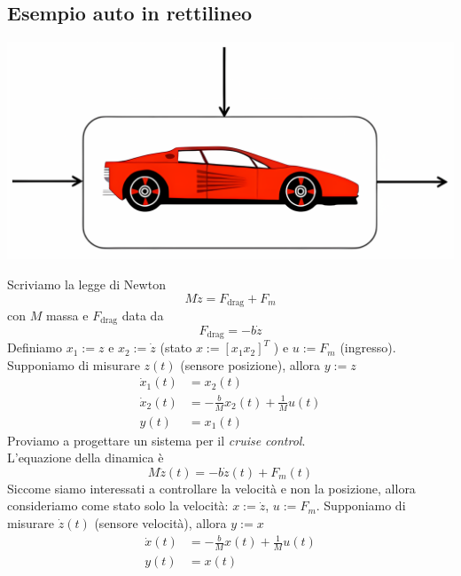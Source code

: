 \documentclass{article}
\begin{document}
\subsection{Esempio auto in rettilineo}
\begin{center}
    \includegraphics[scale=0.18]{Images/Es_Rettilineo.png}
\end{center}
Scriviamo la legge di Newton
\[
    M \ddot z = F_{\text{drag}} + F_m
\]
con $M$ massa e $F_{\text{drag}}$ data da
\[
    F_{\text{drag}} = -b \dot z
\]
Definiamo $x_1 := z$ e $x_2 := \dot z$ (stato $x := [x_1 x_2 ]^T$ ) e $u := F_m$ (ingresso). Supponiamo di misurare $z(t)$ (sensore posizione), allora $y := z$
\begin{align*}
    \dot x_1(t) &= x_2(t)\\
    \dot x_2(t) &= - \frac{b}{M} x_2(t) + \frac{1}{M}u(t)\\
    y(t) &= x_1(t)
\end{align*}
Proviamo a progettare un sistema per il \textit{cruise control}.\\
L'equazione della dinamica è
\[
    M \ddot z(t) = -b\dot z(t) + F_m (t)
\]
Siccome siamo interessati a controllare la velocità e non la posizione, allora consideriamo come stato solo la velocità: $x := \dot z$, $u := F_m$. Supponiamo di misurare $\dot z(t)$ (sensore velocità), allora $y := x$
\begin{align*}
    \dot x(t) &= - \frac{b}{M}x(t) + \frac{1}{M}u(t)\\
    y(t) &= x(t)
\end{align*}
\end{document}
